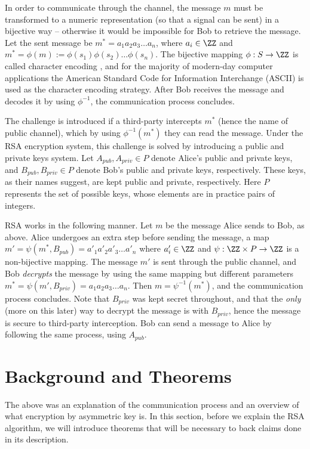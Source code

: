 \documentclass[11pt]{scrartcl}
\begin{document}
In order to communicate through the channel, the message $m$ must be transformed to a
numeric representation (so that a signal can be sent) in a bijective way -- otherwise it
would be impossible for Bob to retrieve the message.  Let the sent message be $m^*=a_1 a_2
a_3 \dots a_n$, where $a_i\in\ZZ$ and $m^*=\phi (m):=\phi(s_1)\phi(s_2)\dots\phi(s_n)$.
The bijective mapping $\phi:S\to\ZZ$ is called character encoding \cite{characterEncoding}, and
for the majority of modern-day computer applications the American Standard Code for
Information Interchange (ASCII) is used as the character encoding strategy. After Bob
receives the message and decodes it by using $\phi^{-1}$, the communication process
concludes.

The challenge is introduced if a third-party intercepts $m^*$ (hence the name of public
channel), which by using $\phi^{-1}(m^*)$ they can read the message. Under the RSA
encryption system, this challenge is solved by introducing a public and private keys
system. Let $A_{pub},A_{priv}\in P$ denote Alice's public and private keys, and
$B_{pub},B_{priv}\in P$ denote Bob's public and private keys, respectively. These keys, as
their names suggest, are kept public and private, respectively. Here $P$ represents the
set of possible keys, whose elements are in practice pairs of integers. 

RSA works in the following manner. Let $m$ be the message Alice sends to Bob, as above.
Alice undergoes an extra step before sending the message, a map $m'=\psi(m^*,
B_{pub})=a'_1 a'_2 a'_3 \dots a'_n$ where $a'_i\in\ZZ$ and $\psi: \ZZ\times P \to \ZZ$ is
a non-bijective mapping. The message $m'$ is sent through the public channel, and Bob
\emph{decrypts} the message by using the same mapping but different parameters
$m^*=\psi(m', B_{priv})=a_1 a_2 a_3 \dots a_n$. Then $m=\psi^{-1}(m^*)$, and the
communication process concludes. Note that $B_{priv}$ was kept secret throughout, and that
the \emph{only} (more on this later) way to decrypt the message is with $B_{priv}$, hence
the message is secure to third-party interception. Bob can send a message to Alice by
following the same process, using $A_{pub}$.

\section{Background and Theorems}\label{background}
The above was an explanation of the communication process and an overview of what
encryption by asymmetric key is. In this section, before we explain the RSA algorithm, we
will introduce theorems that will be necessary to back claims done in its description.
\end{document}
